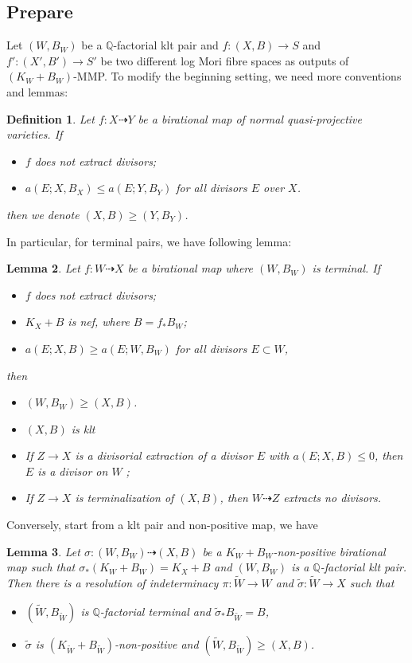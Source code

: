 \documentclass{article}
\newtheorem{defn}{Definition}[subsection]
\newtheorem{lem}[defn]{Lemma}
\begin{document}
\subsection{Prepare}
Let $(W,B_W)$ be a $\mathbb{Q}$-factorial klt pair and $f:(X,B)\to S$ and $f':(X',B')\to S'$ be two different log Mori fibre spaces as outputs of $(K_{W}+B_{W})$-MMP.  To modify the beginning setting, we need more conventions and lemmas:
\begin{defn}
Let $f:X\dashrightarrow Y$ be a birational map of normal quasi-projective varieties. If
\begin{itemize}
  \item $f$ does not extract divisors;
  \item $a(E;X,B_{X})\leqslant a(E;Y,B_{Y})$ for all divisors  $E$  over $X$.
\end{itemize}
then we denote $(X,B)\geqslant (Y,B_{Y})$.
\end{defn}
In particular, for terminal pairs, we have following lemma: 
\begin{lem}\label{terminalorder}
\cite[Lemma 13.8]{haconMinimalModelProgram2012} Let $f:W\dashrightarrow X$ be a birational map where $(W,B_W)$ is terminal. If
\begin{itemize}
  \item $f$ does not extract divisors;
  \item $K_X+B$ is nef, where $B=f_*B_W$;
  \item $a(E;X,B)\geqslant a(E;W,B_W)$ for all divisors $E \subset W$,
\end{itemize}
then
\begin{itemize}
  \item $(W,B_W)\geqslant (X,B)$.
  \item $(X,B)$ is klt
  \item If $Z\to X$ is a divisorial extraction of a divisor $E$ with $a(E;X,B)\leqslant 0$, then $E$ is a divisor on $W$ ;
  \item If $Z\to X$ is terminalization of $(X,B)$, then $W\dashrightarrow Z$ extracts no divisors.
\end{itemize}
\end{lem}
Conversely, start from a klt pair and non-positive map, we have
\begin{lem}\label{terminalresolution}
  \cite[Lemma 3.5]{liuSarkisovProgramGeneralized2019} Let $\sigma:(W,B_W)\dashrightarrow (X,B)$ be a $K_W+B_W$-non-positive birational map such that $\sigma_*(K_W+B_W)=K_X+B$ and $(W,B_W)$ is a $\mathbb{Q}$-factorial klt pair. Then there is a resolution of indeterminacy $\pi:\tilde{W}\to W $ and $\tilde{\sigma}:\tilde{W}\to X$ such that
\begin{itemize}
  \item $(\tilde{W},B_{\tilde{W}})$ is $\mathbb{Q}$-factorial terminal and $\tilde{\sigma}_*B_{\tilde{W}}=B$,
  \item $\tilde{\sigma}$ is $(K_{\tilde{W}}+B_{\tilde{W}})$-non-positive and $(\tilde{W},B_{\tilde{W}})\geqslant (X,B)$.
\end{itemize}
\end{lem}
\end{document}
